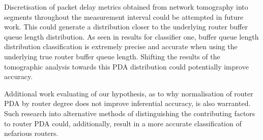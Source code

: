 Discretisation of packet delay metrics obtained from network tomography into segments throughout the measurement interval could be attempted in future work. This could generate a distribution closer to the underlying router buffer queue length distribution. As seen in results for classifier one, buffer queue length distribution classification is extremely precise and accurate when using the underlying true router buffer queue length. Shifting the results of the tomographic analysis towards this PDA distribution could potentially improve accuracy.\par
Additional work evaluating of our hypothesis, as to why normalisation of router PDA by router degree does not improve inferential accuracy, is also warranted. Such research into alternative methods of distinguishing the contributing factors to router PDA could, additionally, result in a more accurate classification of nefarious routers.
